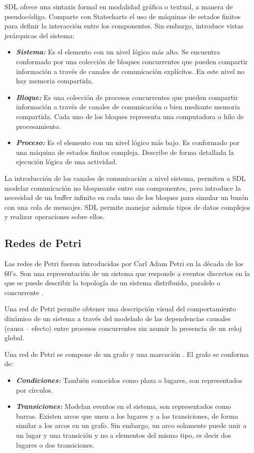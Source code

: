 \documentclass[journal]{IEEEtran}
\begin{document}
SDL ofrece una sintaxis formal en modalidad gráfica o textual, a manera de pseudocódigo.
Comparte con Statecharts el uso de máquinas de estados finitos para definir la interacción entre los componentes.
Sin embargo, introduce vistas jerárquicas del sistema:
\begin{itemize}
	\item \emph{\textbf{Sistema:}} Es el elemento con un nivel lógico más alto.
	Se encuentra conformado por una colección de bloques concurrentes que pueden compartir información a través de canales de comunicación explícitos.
	En este nivel no hay memoria compartida.
	\item \emph{\textbf{Bloque:}} Es una colección de procesos concurrentes que pueden compartir información a través de canales de comunicación o bien mediante memoria compartida.
	Cada uno de los bloques representa una computadora o hilo de procesamiento.
	\item \emph{\textbf{Proceso:}} Es el elemento con un nivel lógico más bajo. 
	Es conformado por una máquina de estados finitos compleja. Describe de forma detallada la ejecución lógica de una actividad.
\end{itemize}

La introducción de los canales de comunicación a nivel sistema, permiten a SDL modelar comunicación no bloqueante entre sus componentes, pero introduce la necesidad de un buffer infinito en cada uno de los bloques para simular un buzón con una cola de mensajes.
SDL permite manejar además tipos de datos complejos y realizar operaciones sobre ellos.

\subsection{Redes de Petri}
Las redes de Petri fueron introducidas por Carl Adam Petri en la década de los 60’s.
Son una representación de un sistema que responde a eventos discretos en la que se puede describir la topología de un sistema distribuido, paralelo o concurrente \cite{Wikipedi2014}.

Una red de Petri permite obtener una descripción visual del comportamiento dinámico de un sistema a través del modelado de las dependencias causales (causa – efecto) entre procesos concurrentes sin asumir la presencia de un reloj global.

Una red de Petri se compone de un grafo y una marcación \cite{Miranda1987}.
El grafo se conforma de:
\begin{itemize}
	\item \emph{\textbf{Condiciones:}} También conocidos como plaza o lugares, son representados por círculos.
	\item \emph{\textbf{Transiciones:}} Modelan eventos en el sistema, son representados como barras.
	Existen arcos que unen a los lugares y a las transiciones, de forma similar a los arcos en un grafo.
	Sin embargo, un arco solamente puede unir a un lugar y una transición y no a elementos del mismo tipo, es decir dos lugares o dos transiciones.
\end{itemize}
\end{document}

